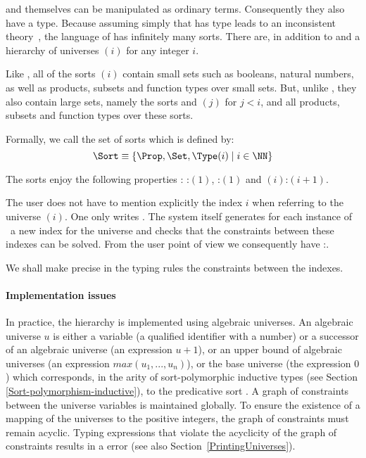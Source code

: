 {\Prop} and {\Set} themselves can be manipulated as ordinary
terms. Consequently they also have a type. Because assuming simply
that {\Set} has type {\Set} leads to an inconsistent theory~\cite{Coq86}, the
language of {\CIC} has infinitely many sorts. There are, in addition
to {\Set} and {\Prop} a hierarchy of universes {\Type$(i)$} for any
integer $i$.

Like {\Set}, all of the sorts {\Type$(i)$} contain small sets such as
booleans, natural numbers, as well as products, subsets and function
types over small sets. But, unlike {\Set}, they also contain large
sets, namely the sorts {\Set} and {\Type$(j)$} for $j<i$, and all
products, subsets and function types over these sorts.

Formally, we call {\Sort} the set of sorts which is defined by:
\[\Sort \equiv \{\Prop,\Set,\Type(i)\;|\; i \in \NN\} \]

The sorts enjoy the following properties%
: {\Prop:\Type$(1)$}, {\Set:\Type$(1)$} and
{\Type$(i)$:\Type$(i+1)$}.

The user does not have to mention explicitly the index $i$ when referring to
the universe \Type$(i)$. One only writes \Type. The
system itself generates for each instance of \Type\ a new
index for the universe and checks that the constraints between these
indexes can be solved. From the user point of view we consequently
have {\Type}:{\Type}.

We shall make precise in the typing rules the constraints between the
indexes. 

\paragraph{Implementation issues}
In practice, the {\Type} hierarchy is implemented using algebraic
universes. An algebraic universe $u$ is either a variable (a qualified
identifier with a number) or a successor of an algebraic universe (an
expression $u+1$), or an upper bound of algebraic universes (an
expression $max(u_1,...,u_n)$), or the base universe (the expression
$0$) which corresponds, in the arity of sort-polymorphic inductive
types (see Section \ref{Sort-polymorphism-inductive}),
to the predicative sort {\Set}. A graph of constraints between
the universe variables is maintained globally. To ensure the existence
of a mapping of the universes to the positive integers, the graph of
constraints must remain acyclic.  Typing expressions that violate the
acyclicity of the graph of constraints results in a  error (see also Section~\ref{PrintingUniverses}).

